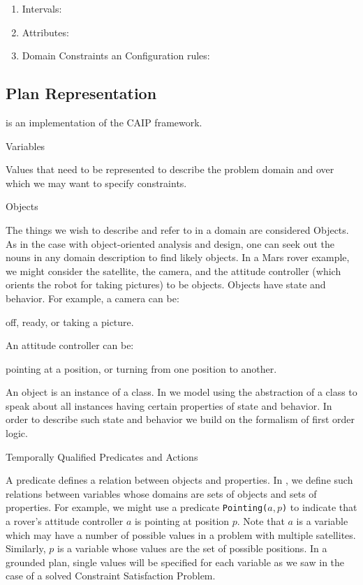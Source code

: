 \begin{enumerate}
	\item Intervals: 
	\item Attributes:
	\item Domain Constraints an Configuration rules:
\end{enumerate}


\subsection{\eu Plan Representation}
\label{sec:europa:pr}

\eu is an implementation of the CAIP framework.


Variables

Values that need to be represented to describe the problem domain and over which we may want to specify constraints.

Objects

The things we wish to describe and refer to in a domain are considered
Objects. As in the case with object-oriented analysis and design, one
can seek out the nouns in any domain description to find likely
objects. In a Mars rover example, we might consider the satellite, the
camera, and the attitude controller (which orients the robot for
taking pictures) to be objects. Objects have state and behavior. For
example, a camera can be:

    off,
    ready, or
    taking a picture. 

An attitude controller can be:

    pointing at a position, or
    turning from one position to another. 

    An object is an instance of a class. In \eu we model using the
    abstraction of a class to speak about all instances having certain
    properties of state and behavior. In order to describe such state
    and behavior we build on the formalism of first order logic.


Temporally Qualified Predicates and Actions

A predicate defines a relation between objects and properties. In \eu,
we define such relations between variables whose domains are sets of
objects and sets of properties. For example, we might use a predicate
\texttt{Pointing($a,p$)} to indicate that a rover's attitude controller
$a$ is pointing at position $p$. Note that $a$ is a variable which may
have a number of possible values in a problem with multiple
satellites. Similarly, $p$ is a variable whose values are the set of
possible positions. In a grounded plan, single values will be
specified for each variable as we saw in the case of a solved
Constraint Satisfaction Problem.

